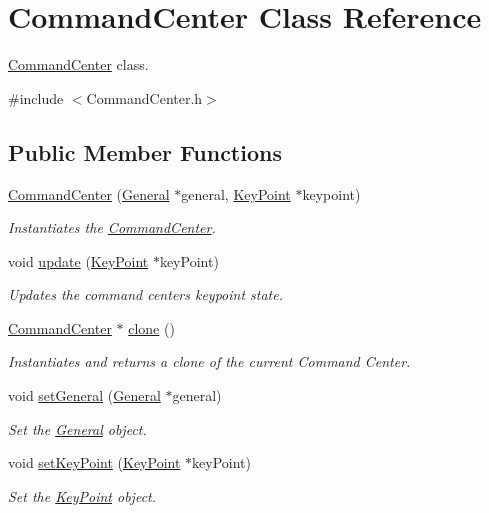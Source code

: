 \hypertarget{classCommandCenter}{}\section{Command\+Center Class Reference}
\label{classCommandCenter}


\hyperlink{classCommandCenter}{Command\+Center} class.  




{\ttfamily \#include $<$Command\+Center.\+h$>$}

\subsection*{Public Member Functions}
\begin{DoxyCompactItemize}
\item 
\mbox{\label{classCommandCenter_a0ecec9fd6d0a28f082665837a791ef07}} 
\hyperlink{classCommandCenter_a0ecec9fd6d0a28f082665837a791ef07}{Command\+Center} (\hyperlink{classGeneral}{General} $\ast$general, \hyperlink{classKeyPoint}{Key\+Point} $\ast$keypoint)
\begin{DoxyCompactList}\small\item\em Instantiates the \hyperlink{classCommandCenter}{Command\+Center}. \end{DoxyCompactList}\item 
void \hyperlink{classCommandCenter_a1aee52be7351e2e2c78c8d239d31cff0}{update} (\hyperlink{classKeyPoint}{Key\+Point} $\ast$key\+Point)
\begin{DoxyCompactList}\small\item\em Updates the command center\textquotesingle{}s keypoint state. \end{DoxyCompactList}\item 
\hyperlink{classCommandCenter}{Command\+Center} $\ast$ \hyperlink{classCommandCenter_aef666a19f24fd089edd089e4b2cb9542}{clone} ()
\begin{DoxyCompactList}\small\item\em Instantiates and returns a clone of the current Command Center. \end{DoxyCompactList}\item 
void \hyperlink{classCommandCenter_a755d1f8677d6764a59ba8e8e4909103d}{set\+General} (\hyperlink{classGeneral}{General} $\ast$general)
\begin{DoxyCompactList}\small\item\em Set the \hyperlink{classGeneral}{General} object. \end{DoxyCompactList}\item 
void \hyperlink{classCommandCenter_a585052e0a546ce307090c43b95dad5fa}{set\+Key\+Point} (\hyperlink{classKeyPoint}{Key\+Point} $\ast$key\+Point)
\begin{DoxyCompactList}\small\item\em Set the \hyperlink{classKeyPoint}{Key\+Point} object. \end{DoxyCompactList}\end{DoxyCompactItemize}


